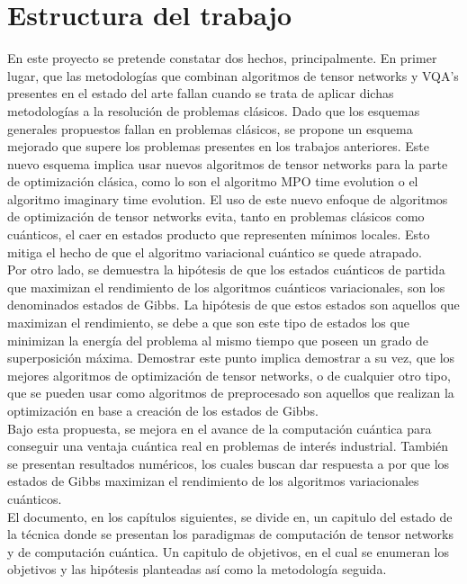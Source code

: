 \newpage

\section{Estructura del trabajo}

En este proyecto se pretende constatar dos hechos, principalmente. En primer lugar, que las metodologías que combinan algoritmos de tensor networks y VQA's presentes en el estado del arte fallan cuando se trata de aplicar dichas metodologías a la resolución de problemas clásicos. Dado que los esquemas generales propuestos fallan en problemas clásicos, se propone un esquema mejorado que supere los problemas presentes en los trabajos anteriores. Este nuevo esquema implica usar nuevos algoritmos de tensor networks para la parte de optimización clásica, como lo son el algoritmo MPO time evolution o el algoritmo imaginary time evolution. El uso de este nuevo enfoque de algoritmos de optimización de tensor networks evita, tanto en problemas clásicos como cuánticos, el caer en estados producto que representen mínimos locales. Esto mitiga el hecho de que el algoritmo variacional cuántico se quede atrapado. \\

Por otro lado, se demuestra la hipótesis de que los estados cuánticos de partida que maximizan el rendimiento de los algoritmos cuánticos variacionales, son los denominados estados de Gibbs. La hipótesis de que estos estados son aquellos que maximizan el rendimiento, se debe a que son este tipo de estados los que minimizan la energía del problema al mismo tiempo que poseen un grado de superposición máxima. Demostrar este punto implica demostrar a su vez, que los mejores algoritmos de optimización de tensor networks, o de cualquier otro tipo, que se pueden usar como algoritmos de preprocesado son aquellos que realizan la optimización en base a creación de los estados de Gibbs. \\

Bajo esta propuesta, se mejora en el avance de la computación cuántica para conseguir una ventaja cuántica real en problemas de interés industrial. También se presentan resultados numéricos, los cuales buscan dar respuesta a por que los estados de Gibbs maximizan el rendimiento de los algoritmos variacionales cuánticos. \\

El documento, en los capítulos siguientes, se divide en, un capitulo del estado de la técnica donde se presentan los paradigmas de computación de tensor networks y de computación cuántica. Un capitulo de objetivos, en el cual se enumeran los objetivos y las hipótesis planteadas así como la metodología seguida. 

